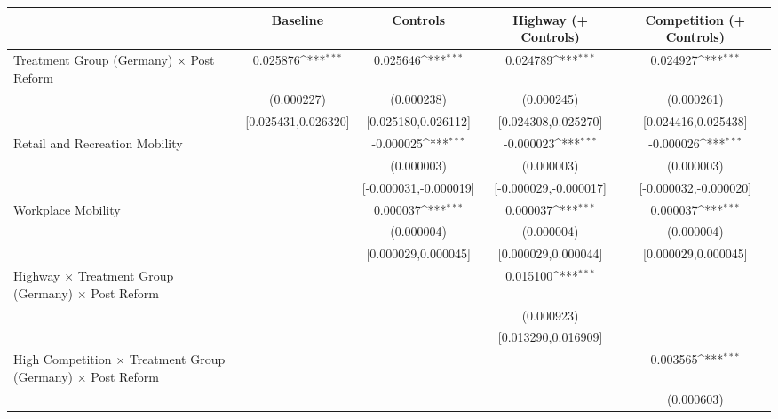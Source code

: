 {
\def\sym#1{\ifmmode^{#1}\else\(^{#1}\)\fi}
\begin{tabular}{l*{4}{c}}
\toprule
                    &\multicolumn{1}{c}{Baseline}&\multicolumn{1}{c}{Controls}&\multicolumn{1}{c}{Highway (+ Controls)}&\multicolumn{1}{c}{Competition (+ Controls)}\\
\midrule
Treatment Group (Germany) $\times$ Post Reform&    0.025876\sym{***}&    0.025646\sym{***}&    0.024789\sym{***}&    0.024927\sym{***}\\
                    &  (0.000227)         &  (0.000238)         &  (0.000245)         &  (0.000261)         \\
                    &[0.025431,0.026320]         &[0.025180,0.026112]         &[0.024308,0.025270]         &[0.024416,0.025438]         \\
Retail and Recreation Mobility&                     &   -0.000025\sym{***}&   -0.000023\sym{***}&   -0.000026\sym{***}\\
                    &                     &  (0.000003)         &  (0.000003)         &  (0.000003)         \\
                    &                     &[-0.000031,-0.000019]         &[-0.000029,-0.000017]         &[-0.000032,-0.000020]         \\
Workplace Mobility  &                     &    0.000037\sym{***}&    0.000037\sym{***}&    0.000037\sym{***}\\
                    &                     &  (0.000004)         &  (0.000004)         &  (0.000004)         \\
                    &                     &[0.000029,0.000045]         &[0.000029,0.000044]         &[0.000029,0.000045]         \\
Highway $\times$ Treatment Group (Germany) $\times$ Post Reform&                     &                     &    0.015100\sym{***}&                     \\
                    &                     &                     &  (0.000923)         &                     \\
                    &                     &                     &[0.013290,0.016909]         &                     \\
High Competition $\times$ Treatment Group (Germany) $\times$ Post Reform&                     &                     &                     &    0.003565\sym{***}\\
                    &                     &                     &                     &  (0.000603)         \\

\end{tabular}}
